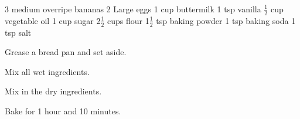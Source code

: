 \dishtype{\bread}
\dishother{\vegetarian}
\begin{ingreds}
    3 medium overripe bananas
    2 Large eggs
    1 cup buttermilk
    1 tsp vanilla
    $\frac{1}{2}$ cup vegetable oil
    1 cup sugar
    2$\frac{1}{2}$ cups flour
    1$\frac{1}{2}$ tsp baking powder
    1 tsp baking soda
    1 tsp salt  
\end{ingreds}
\begin{method}
    Grease a bread pan and set aside.\par
    Mix all wet ingredients.\par
    Mix in the dry ingredients.\par
    Bake for 1 hour and 10 minutes.
\end{method}